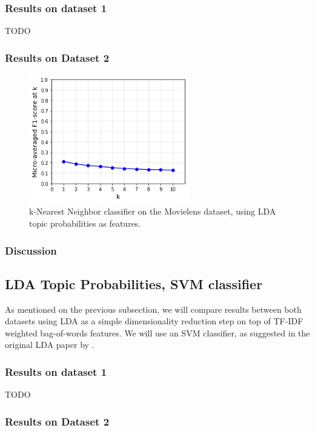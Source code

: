 \subsubsection{Results on dataset 1}

{\color{red} TODO}

\subsubsection{Results on Dataset 2}

\begin{figure}[H]
    \centering
    \includegraphics[width=7cm]{chapters/05_experiments/images/knn-lda-movielens.png}
    \caption{k-Nearest Neighbor classifier on the Movielens dataset, using LDA topic probabilities as features.}
    \label{fig:knn_lda_movielens}
\end{figure}

\subsubsection{Discussion}

\subsection{LDA Topic Probabilities, SVM classifier}

As mentioned on the previous subsection, we will compare results between both datasets using LDA as a simple dimensionality reduction step on top of TF-IDF weighted bag-of-words features. We will use an SVM classifier, as suggested in the original LDA paper by \cite{blei_etal_2003}.

\subsubsection{Results on dataset 1}

{\color{red} TODO}

\subsubsection{Results on Dataset 2}

